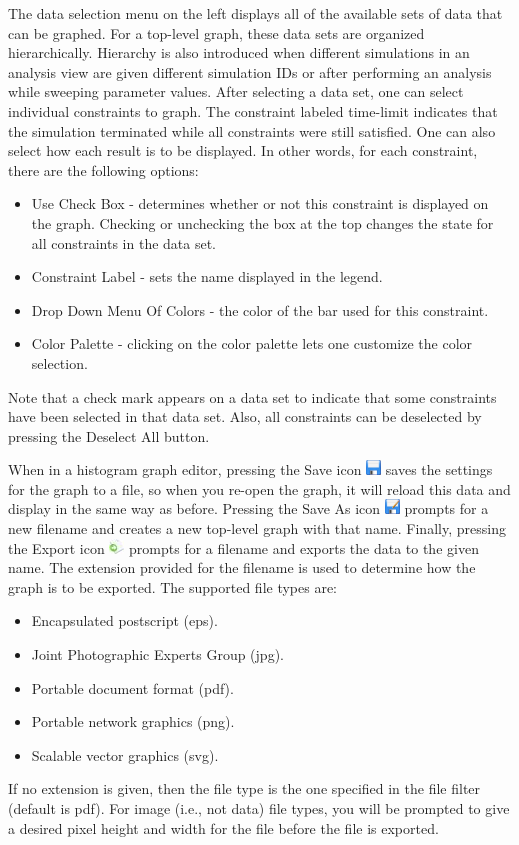 \documentclass[titlepage,11pt]{article}
\begin{document}
The data selection menu on the left displays all of the available sets of data that can be graphed.  For a top-level graph, these data sets are organized hierarchically.  Hierarchy is also introduced when different simulations in an analysis view are given different simulation IDs or after performing an analysis while sweeping parameter values.  After selecting a data set, one can select individual constraints to graph.  The constraint labeled time-limit indicates that the simulation terminated while all constraints were still satisfied.  One can also select how each result is to be displayed.  In other words, for each constraint, there are the following options: 
\begin{itemize}
\item Use Check Box - determines whether or not this constraint is displayed on the graph.  Checking or 
unchecking the box at the top changes the state for all constraints in the data set. 
\item Constraint Label - sets the name displayed in the legend. 
\item Drop Down Menu Of Colors - the color of the bar used for this constraint.
\item Color Palette - clicking on the color palette lets one customize the color selection. 
\end{itemize}
Note that a check mark appears on a data set to indicate that some constraints have been selected in that data set.  Also, all constraints can be deselected by pressing the Deselect All button.

When in a histogram graph editor, pressing the Save icon \includegraphics{../gui/icons/save} saves the settings for the graph to a file, so when you re-open the graph, it will reload this data and display in the same way as before.  Pressing the Save As icon \includegraphics{../gui/icons/saveas} prompts for a new filename and creates a new top-level graph with that name.  Finally, pressing the Export icon \includegraphics{../gui/icons/export} prompts for a filename and exports the data to the given name.  The extension provided for the filename is used to determine how the graph is to be exported. The supported file types are: 
\begin{itemize}
\item Encapsulated postscript (eps). 
\item Joint Photographic Experts Group (jpg). 
\item Portable document format (pdf).
\item Portable network graphics (png). 
\item Scalable vector graphics (svg).
\end{itemize}
If no extension is given, then the file type is the one specified in the file filter (default is pdf).  For image (i.e.,
not data) file types, you will be prompted to give a desired pixel height and width for the file before the file is exported. 
\end{document}
